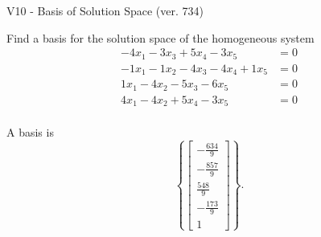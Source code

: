 \begin{exercise}
  \begin{exerciseTitle}V10 - Basis of Solution Space (ver. 734)\end{exerciseTitle}
  \begin{exerciseStatement}
    Find a basis for the solution space of the homogeneous system 
\begin{align*}
 -4 x_ 1 -3 x_ 3 + 5 x_ 4 -3 x_ 5 &= 0  \\ 
  -1 x_ 1 -1 x_ 2 -4 x_ 3 -4 x_ 4 + 1 x_ 5 &= 0  \\ 
  1 x_ 1 -4 x_ 2 -5 x_ 3 -6 x_ 5 &= 0  \\ 
  4 x_ 1 -4 x_ 2 + 5 x_ 4 -3 x_ 5 &= 0  \\ 
 \end{align*}


 
  \end{exerciseStatement}

  \begin{exerciseAnswer}
   A basis is   
\[\left\{\left[\begin{array}{c}
-\frac{634}{9} \\
-\frac{857}{9} \\
\frac{548}{9} \\
-\frac{173}{9} \\
1
\end{array}\right]\right\}.\]

  


  \end{exerciseAnswer}
\end{exercise}